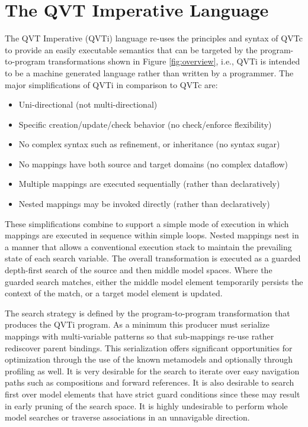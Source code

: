 %
\section{The QVT Imperative Language}\label{sec:qvti}
The QVT Imperative (QVTi) language re-uses the principles and syntax of QVTc to provide an easily executable semantics that can be targeted by the program-to-program transformations shown in Figure \ref{fig:overview}, i.e., QVTi is intended to be a machine generated language rather than written by a programmer. The major simplifications of QVTi in comparison to QVTc are:
\begin{itemize}
\item Uni-directional (not multi-directional)
\item Specific creation/update/check behavior (no check/enforce flexibility)
\item No complex syntax such as refinement, or inheritance (no syntax sugar)
\item No mappings have both source and target domains (no complex dataflow)
\item Multiple mappings are executed sequentially (rather than declaratively)
\item Nested mappings may be invoked directly (rather than declaratively)
\end{itemize}

These simplifications combine to support a simple mode of execution in which mappings are executed in sequence within simple loops. Nested mappings nest in a manner that allows a conventional execution stack to maintain the prevailing state of each search variable. The overall transformation is executed as a guarded depth-first search of the source and then middle model spaces. Where the guarded search matches, either the middle model element temporarily persists the context of the match, or a target model element is updated.

The search strategy is defined by the program-to-program transformation that produces the QVTi program. As a minimum this producer must serialize mappings with multi-variable patterns so that sub-mappings re-use rather rediscover parent bindings. This serialization offers significant opportunities for optimization through the use of the known metamodels and optionally through profiling as well. It is very desirable for the search to iterate over easy navigation paths such as compositions and forward references. It is also desirable to search first over model elements that have strict guard conditions since these may result in early pruning of the search space. It is highly undesirable to perform whole model searches or traverse associations in an unnavigable direction. 


